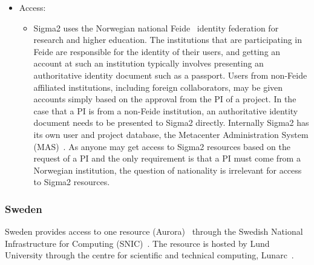 \documentclass{article}
\begin{document}
\begin{itemize}
\item[]Access:
\begin{itemize} 
\item[] Sigma2 uses the Norwegian national Feide~\cite{feide} identity federation for research and higher education. The institutions that are participating in Feide are responsible for the identity of their users, and getting an account at such an institution typically involves presenting an authoritative identity document such as a passport. Users from non-Feide affiliated institutions, including foreign collaborators, may be given accounts simply based on the approval from the PI of a project. 
In the case that a PI is from a non-Feide institution, an authoritative identity document needs to be presented to Sigma2 directly. Internally Sigma2 has its own user and project database, the Metacenter Administration System (MAS)~\cite{mas}. 
As anyone may get access to Sigma2 resources based on the request of a PI and the only requirement is that a PI must come from a Norwegian institution, the question of nationality is irrelevant for access to Sigma2 resources.
\end{itemize} 
\end{itemize} 

\subsubsection{Sweden}
Sweden provides access to one resource (Aurora)~\cite{aurora} through the Swedish National Infrastructure for Computing (SNIC)~\cite{snic}. The resource is hosted by Lund University through the centre for scientific and technical computing, Lunarc~\cite{aurora}.
\end{document}
